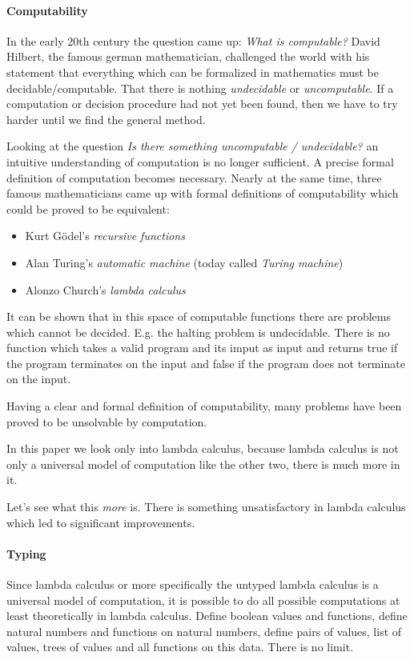 \paragraph{Computability}
In the early 20th century the question came up: \emph{What is
computable?} David Hilbert, the famous german mathematician, challenged
the world with his statement that everything which can be formalized in
mathematics must be decidable/computable.  That there is nothing
\emph{undecidable} or \emph{uncomputable}. If a computation or decision
procedure had not yet been found, then we have to try harder until we find the
general method.

Looking at the question \emph{Is there something uncomputable / undecidable?} an
intuitive understanding of computation is no longer sufficient. A precise formal
definition of computation becomes necessary. Nearly at the same time, three
famous mathematicians came up with formal definitions of computability which
could be proved to be equivalent:

\begin{itemize}
\item Kurt Gödel's \emph{recursive functions}

\item Alan Turing's \emph{automatic machine} (today called \emph{Turing
machine})

\item Alonzo Church's \emph{lambda calculus}
\end{itemize}

It can be shown that in this space of computable functions there are problems
which cannot be decided. E.g. the halting problem is undecidable. There is no
function which takes a valid program and its imput as input and returns true if
the program terminates on the input and false if the program does not terminate
on the input.

Having a clear and formal definition of computability, many problems have been
proved to be unsolvable by computation.

In this paper we look only into lambda calculus, because lambda calculus is not
only a universal model of computation like the other two, there is much more in
it.

Let's see what this \emph{more} is. There is something unsatisfactory in lambda
calculus which led to significant improvements.

\paragraph{Typing}
Since lambda calculus or more specifically the untyped lambda calculus is a
universal model of computation, it is possible to do all possible computations
at least theoretically in lambda calculus. Define boolean values and functions,
define natural numbers and functions on natural numbers, define pairs of values,
list of values, trees of values and all functions on this data. There is no
limit.

